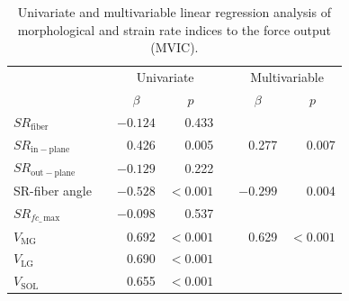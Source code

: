\begin{table}[!htb]
\vspace{+0.2cm}
\caption[Univariate and multivariable linear regression analysis of morphological and strain rate indices to the force output]{Univariate and multivariable linear regression analysis of morphological and strain rate indices to the force output (MVIC).}
\label{tab: SR1_3}
\begin{center}
\begin{tabular}{@{}lrrrrrr@{}}
\toprule[1pt]\midrule[0.3pt]
               && \multicolumn{2}{c}{Univariate} &  & \multicolumn{2}{c}{Multivariable} \\ \cmidrule(lr){3-4} \cmidrule(lr){6-7}
               && \multicolumn{1}{c}{$\beta$}     & \multicolumn{1}{c}{$p$}            &  & \multicolumn{1}{c}{$\beta$}       & \multicolumn{1}{c}{$p$}              \\ \midrule
$SR_{\mathrm{fiber}}$       & & $-0.124$    & 0.433              &  &            &                     \\ [2pt]
$SR_{\mathrm{in-plane}}$    & & 0.426     & 0.005              &  & 0.277      & 0.007               \\ [2pt]
$SR_{\mathrm{out-plane}}$   & & $-0.129$    & 0.222              &  &            &                     \\ [2pt]
SR-fiber angle 			   & & $-0.528$    & $<0.001$   &  & $-0.299$     & 0.004               \\ [2pt]
$SR_{fc\_\,\mathrm{max}}$  & & $-0.098$     & 0.537              &  &            &                     \\ [2pt]
$V_{\mathrm{MG}}$          & & 0.692     & $<0.001$   &  & 0.629       & $<0.001$    \\ [2pt]
$V_{\mathrm{LG}}$          & & 0.690     & $<0.001$   &  &            &                     \\ [2pt]
$V_{\mathrm{SOL}}$         & & 0.655     & $<0.001$   &  &            &                     \\ \midrule[0.3pt]\bottomrule[1pt]
\end{tabular}
\end{center}
\vspace{-0.2cm}
\end{table}
